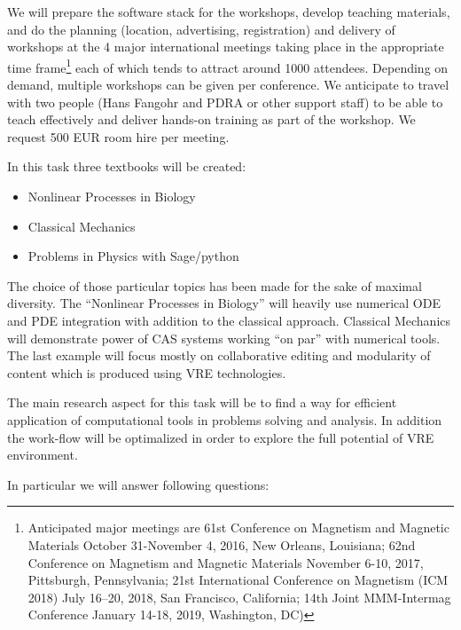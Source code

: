 \begin{workpackage}[id=dissem,wphases=18-48!.5,
  title=Dissemination,
  SARM=1,
  USORM=7,
<<<<<<< HEAD
  USHRM=8
=======
  USHRM=8,
  USRM=24
>>>>>>> e490abbfa8a91427570f1a7695a6a95cd4610713
]
\begin{task}[title=OOMMF-NB dissemination workshops,
id=dissemination-of-oommf-nb-workshops]
  We will prepare the software stack for the workshops, develop teaching
  materials, and do the planning (location, advertising, registration)
  and delivery of workshops at the 4 major international meetings
  taking place in the appropriate time frame\footnote{Anticipated
    major meetings are 61st Conference
    on Magnetism and Magnetic Materials October 31-November 4, 2016,
    New Orleans, Louisiana; 62nd Conference on Magnetism and Magnetic
    Materials November 6-10, 2017, Pittsburgh, Pennsylvania; 21st
    International Conference on Magnetism (ICM 2018) July 16–20, 2018,
    San Francisco, California; 14th Joint MMM-Intermag Conference
    January 14-18, 2019, Washington, DC)} each of which tends to
  attract around 1000 attendees. Depending on demand, multiple
  workshops can be given per conference. We anticipate to travel with two
  people (Hans Fangohr and PDRA or other support staff) to be able to teach
  effectively and deliver hands-on training as part of the
  workshop. We request 500 EUR room hire per meeting.
\end{task}


\begin{task}[title=Demonstrator: interactive books,
id=ibook]
  In this task three textbooks will be created:

\begin{itemize}
\item Nonlinear Processes in Biology 
\item Classical Mechanics  
\item Problems  in Physics with Sage/python    
\end{itemize}

The choice of those particular topics has been made for the sake of  maximal diversity. The ``Nonlinear Processes in Biology'' will heavily use numerical ODE and PDE integration with addition to the classical approach. Classical Mechanics will demonstrate power of CAS systems working ``on par'' with numerical tools. The last example will focus mostly on collaborative editing and modularity of content which is produced using VRE technologies. 

The main research aspect for this task will be to find a way for efficient application of computational tools in problems solving and analysis. In addition the work-flow will be optimalized in order to explore the full potential of VRE environment. 

In particular we will answer following questions:


\end{task}
\end{workpackage}
